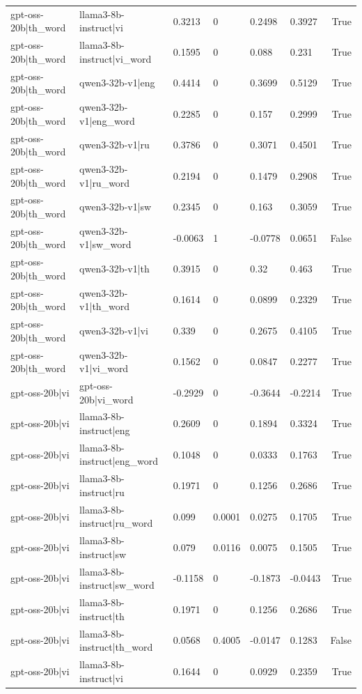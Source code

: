 \begin{table}
\begin{tabular}{llllllr}
gpt-oss-20b|th_word & llama3-8b-instruct|vi & 0.3213 & 0 & 0.2498 & 0.3927 & True \\
gpt-oss-20b|th_word & llama3-8b-instruct|vi_word & 0.1595 & 0 & 0.088 & 0.231 & True \\
gpt-oss-20b|th_word & qwen3-32b-v1|eng & 0.4414 & 0 & 0.3699 & 0.5129 & True \\
gpt-oss-20b|th_word & qwen3-32b-v1|eng_word & 0.2285 & 0 & 0.157 & 0.2999 & True \\
gpt-oss-20b|th_word & qwen3-32b-v1|ru & 0.3786 & 0 & 0.3071 & 0.4501 & True \\
gpt-oss-20b|th_word & qwen3-32b-v1|ru_word & 0.2194 & 0 & 0.1479 & 0.2908 & True \\
gpt-oss-20b|th_word & qwen3-32b-v1|sw & 0.2345 & 0 & 0.163 & 0.3059 & True \\
gpt-oss-20b|th_word & qwen3-32b-v1|sw_word & -0.0063 & 1 & -0.0778 & 0.0651 & False \\
gpt-oss-20b|th_word & qwen3-32b-v1|th & 0.3915 & 0 & 0.32 & 0.463 & True \\
gpt-oss-20b|th_word & qwen3-32b-v1|th_word & 0.1614 & 0 & 0.0899 & 0.2329 & True \\
gpt-oss-20b|th_word & qwen3-32b-v1|vi & 0.339 & 0 & 0.2675 & 0.4105 & True \\
gpt-oss-20b|th_word & qwen3-32b-v1|vi_word & 0.1562 & 0 & 0.0847 & 0.2277 & True \\
gpt-oss-20b|vi & gpt-oss-20b|vi_word & -0.2929 & 0 & -0.3644 & -0.2214 & True \\
gpt-oss-20b|vi & llama3-8b-instruct|eng & 0.2609 & 0 & 0.1894 & 0.3324 & True \\
gpt-oss-20b|vi & llama3-8b-instruct|eng_word & 0.1048 & 0 & 0.0333 & 0.1763 & True \\
gpt-oss-20b|vi & llama3-8b-instruct|ru & 0.1971 & 0 & 0.1256 & 0.2686 & True \\
gpt-oss-20b|vi & llama3-8b-instruct|ru_word & 0.099 & 0.0001 & 0.0275 & 0.1705 & True \\
gpt-oss-20b|vi & llama3-8b-instruct|sw & 0.079 & 0.0116 & 0.0075 & 0.1505 & True \\
gpt-oss-20b|vi & llama3-8b-instruct|sw_word & -0.1158 & 0 & -0.1873 & -0.0443 & True \\
gpt-oss-20b|vi & llama3-8b-instruct|th & 0.1971 & 0 & 0.1256 & 0.2686 & True \\
gpt-oss-20b|vi & llama3-8b-instruct|th_word & 0.0568 & 0.4005 & -0.0147 & 0.1283 & False \\
gpt-oss-20b|vi & llama3-8b-instruct|vi & 0.1644 & 0 & 0.0929 & 0.2359 & True \\

\end{tabular}
\end{table}
